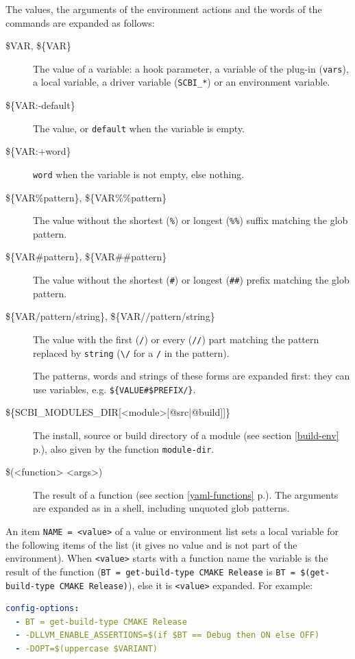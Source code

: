 \documentclass[a4paper,12pt,twoside]{article}
\newcommand{\code}[1]{\texttt{#1}}
\newcommand{\seeref}[1]{see section \ref{#1} p.\pageref{#1}}
\begin{document}
The values, the arguments of the environment actions and the words of the
commands are expanded as follows:

\begin{description}
	\item[\$VAR, \$\{VAR\}] The value of a variable: a hook parameter, a
	variable of the plug-in (\code{vars}), a local variable, a driver
	variable (\code{SCBI\_*}) or an environment variable.
	\item[\$\{VAR:-default\}] The value, or \code{default} when the
	variable is empty.
	\item[\$\{VAR:+word\}] \code{word} when the variable is not empty,
	else nothing.
	\item[\$\{VAR\%pattern\}, \$\{VAR\%\%pattern\}] The value without the
	shortest (\code{\%}) or longest (\code{\%\%}) suffix matching the glob
	pattern.
	\item[\$\{VAR\#pattern\}, \$\{VAR\#\#pattern\}] The value without the
	shortest (\code{\#}) or longest (\code{\#\#}) prefix matching the glob
	pattern.
	\item[\$\{VAR/pattern/string\}, \$\{VAR//pattern/string\}] The value with
	the first (\code{/}) or every (\code{//}) part matching the pattern
	replaced by \code{string} (\code{\textbackslash/} for a \code{/} in the
	pattern).

	The patterns, words and strings of these forms are expanded first: they
	can use variables, e.g. \code{\$\{VALUE\#\$PREFIX/\}}.
	\item[{\$\{SCBI\_MODULES\_DIR[<module>[@src|@build]]\}}] The install,
	source or build directory of a module (\seeref{build-env}), also given
	by the function \code{module-dir}.
	\item[\$(<function> <args>)] The result of a function
	(\seeref{yaml-functions}). The arguments are expanded as in a shell,
	including unquoted glob patterns.
\end{description}

An item \code{NAME = <value>} of a value or environment list sets a local
variable for the following items of the list (it gives no value and is not
part of the environment). When \code{<value>} starts with a function name
the variable is the result of the function (\code{BT = get-build-type
CMAKE Release} is \code{BT = \$(get-build-type CMAKE Release)}), else it
is \code{<value>} expanded. For example:

\begin{lstlisting}[language={yaml}]
config-options:
  - BT = get-build-type CMAKE Release
  - -DLLVM_ENABLE_ASSERTIONS=$(if $BT == Debug then ON else OFF)
  - -DOPT=$(uppercase $VARIANT)
\end{lstlisting}
\end{document}
